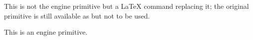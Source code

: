 \begin{function}[]
  {
    \sfdef@ult
  }
  \begin{syntax}
  \end{syntax}

\end{function}



\begin{function}[]
  {
    \sffamily
  }
  \begin{syntax}
  \end{syntax}

\end{function}



\begin{function}[]
  {
    \sfsubstdefault
  }
  \begin{syntax}
  \end{syntax}

\end{function}



\begin{function}[]
  {
    \sh@ft
  }
  \begin{syntax}
  \end{syntax}

\end{function}



\begin{function}[]
  {
    \shipout
  }
  \begin{syntax}
  \end{syntax}
  This is not the engine primitive  but a \LaTeX{} command
  replacing it; the original primitive is still available as
   but not to be used.
\end{function}



\begin{function}[]
  {
    \shortstack
  }
  \begin{syntax}
  \end{syntax}

\end{function}



\begin{function}[]
  {
    \show
  }
  \begin{syntax}
  \end{syntax}
  This is an engine primitive.
\end{function}



